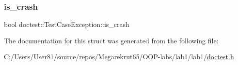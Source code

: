 \subsubsection{\texorpdfstring{is\+\_\+crash}{is\_crash}}
{\footnotesize\ttfamily bool doctest\+::\+Test\+Case\+Exception\+::is\+\_\+crash}



The documentation for this struct was generated from the following file\+:\begin{DoxyCompactItemize}
\item 
C\+:/\+Users/\+User81/source/repos/\+Megarekrut65/\+O\+O\+P-\/labs/lab1/lab1/\mbox{\hyperlink{doctest_8h}{doctest.\+h}}\end{DoxyCompactItemize}
